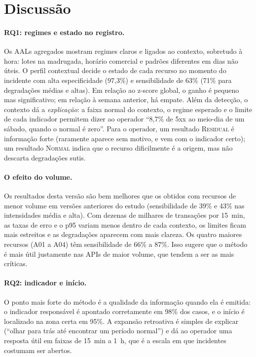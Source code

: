 \documentclass[sigconf,nonacm]{acmart}
\newcommand{\Normal}{\textsc{Normal}\xspace}
\newcommand{\Residual}{\textsc{Residual}\xspace}
\begin{document}
\section{Discussão}\label{sec:discussao}

\paragraph{RQ1: regimes e estado no registro.} Os AALs agregados mostram regimes claros e ligados ao contexto, sobretudo à hora: lotes na madrugada, horário comercial e padrões diferentes em dias não úteis. O perfil contextual decide o estado de cada recurso no momento do incidente com alta especificidade (97,3\%) e sensibilidade de 63\% (71\% para degradações médias e altas). Em relação ao z-score global, o ganho é pequeno mas significativo; em relação à semana anterior, há empate. Além da detecção, o contexto dá a \emph{explicação}: a faixa normal do contexto, o regime esperado e o limite de cada indicador permitem dizer ao operador ``8,7\% de 5xx ao meio-dia de um sábado, quando o normal é zero''. Para o operador, um resultado \Residual é informação forte (raramente aparece sem motivo, e vem com o indicador certo); um resultado \Normal indica que o recurso dificilmente é a origem, mas não descarta degradações sutis.

\paragraph{O efeito do volume.} Os resultados desta versão são bem melhores que os obtidos com recursos de menor volume em versões anteriores do estudo (sensibilidade de 39\% e 43\% nas intensidades média e alta). Com dezenas de milhares de transações por 15~min, as taxas de erro e o p95 variam menos dentro de cada contexto, os limites ficam mais estreitos e as degradações aparecem com mais clareza. Os quatro maiores recursos (A01 a A04) têm sensibilidade de 66\% a 87\%. Isso sugere que o método é mais útil justamente nas APIs de maior volume, que tendem a ser as mais críticas.

\paragraph{RQ2: indicador e início.} O ponto mais forte do método é a qualidade da informação quando ela é emitida: o indicador responsável é apontado corretamente em 98\% dos casos, e o início é localizado na zona certa em 95\%. A expansão retroativa é simples de explicar (``olhar para trás até encontrar um período normal'') e dá ao operador uma resposta útil em faixas de 15~min a 1~h, que é a escala em que incidentes costumam ser abertos.
\end{document}
